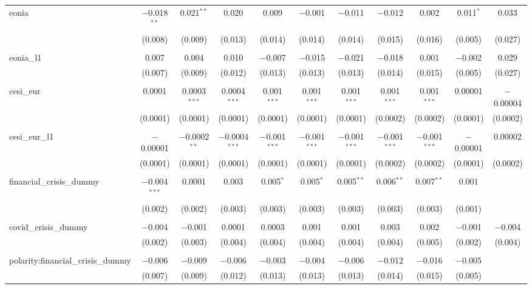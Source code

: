 \begin{table}[!htbp]
\begin{adjustbox}{width=1.25\textwidth}
\begin{tabular}{@{\extracolsep{5pt}}lcccccccccc}
 eonia & $-$0.018$^{**}$ & 0.021$^{**}$ & 0.020 & 0.009 & $-$0.001 & $-$0.011 & $-$0.012 & 0.002 & 0.011$^{*}$ & 0.033 \\ 
  & (0.008) & (0.009) & (0.013) & (0.014) & (0.014) & (0.014) & (0.015) & (0.016) & (0.005) & (0.027) \\ 
  & & & & & & & & & & \\ 
 eonia\_l1 & 0.007 & 0.004 & 0.010 & $-$0.007 & $-$0.015 & $-$0.021 & $-$0.018 & 0.001 & $-$0.002 & 0.029 \\ 
  & (0.007) & (0.009) & (0.012) & (0.013) & (0.013) & (0.013) & (0.014) & (0.015) & (0.005) & (0.027) \\ 
  & & & & & & & & & & \\ 
 cesi\_eur & 0.0001 & 0.0003$^{***}$ & 0.0004$^{***}$ & 0.001$^{***}$ & 0.001$^{***}$ & 0.001$^{***}$ & 0.001$^{***}$ & 0.001$^{***}$ & 0.00001 & $-$0.00004 \\ 
  & (0.0001) & (0.0001) & (0.0001) & (0.0001) & (0.0001) & (0.0001) & (0.0002) & (0.0002) & (0.0001) & (0.0002) \\ 
  & & & & & & & & & & \\ 
 cesi\_eur\_l1 & $-$0.00001 & $-$0.0002$^{**}$ & $-$0.0004$^{***}$ & $-$0.001$^{***}$ & $-$0.001$^{***}$ & $-$0.001$^{***}$ & $-$0.001$^{***}$ & $-$0.001$^{***}$ & $-$0.00001 & 0.00002 \\ 
  & (0.0001) & (0.0001) & (0.0001) & (0.0001) & (0.0001) & (0.0001) & (0.0002) & (0.0002) & (0.0001) & (0.0002) \\ 
  & & & & & & & & & & \\ 
 financial\_crisis\_dummy & $-$0.004$^{***}$ & 0.0001 & 0.003 & 0.005$^{*}$ & 0.005$^{*}$ & 0.005$^{**}$ & 0.006$^{**}$ & 0.007$^{**}$ & 0.001 &  \\ 
  & (0.002) & (0.002) & (0.003) & (0.003) & (0.003) & (0.003) & (0.003) & (0.003) & (0.001) &  \\ 
  & & & & & & & & & & \\ 
 covid\_crisis\_dummy & $-$0.004 & $-$0.001 & 0.0001 & 0.0003 & 0.001 & 0.001 & 0.003 & 0.002 & $-$0.001 & $-$0.004 \\ 
  & (0.002) & (0.003) & (0.004) & (0.004) & (0.004) & (0.004) & (0.004) & (0.005) & (0.002) & (0.004) \\ 
  & & & & & & & & & & \\ 
 polarity:financial\_crisis\_dummy & $-$0.006 & $-$0.009 & $-$0.006 & $-$0.003 & $-$0.004 & $-$0.006 & $-$0.012 & $-$0.016 & $-$0.005 &  \\ 
  & (0.007) & (0.009) & (0.012) & (0.013) & (0.013) & (0.013) & (0.014) & (0.015) & (0.005) &  \\ 

\end{tabular}
\end{adjustbox}
\end{table}
